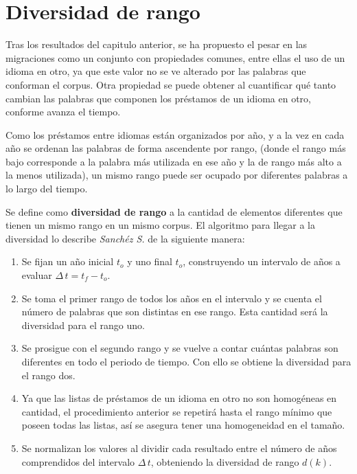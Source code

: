 \chapter{Diversidad de rango}
\label{cap.diversidad}

Tras los resultados del capitulo anterior, se ha propuesto el pesar en las migraciones como un conjunto con propiedades comunes, entre ellas el uso de un idioma en otro,  ya que este valor no se ve alterado por las palabras que conforman el corpus. Otra propiedad se puede obtener al cuantificar qué tanto cambian las palabras que componen los préstamos de un idioma en otro, conforme avanza el tiempo. 
  
Como los préstamos entre idiomas están organizados por año, y a la vez en cada año se ordenan las palabras de forma ascendente por rango, (donde el rango más bajo corresponde a la palabra más utilizada en ese año y la de rango más alto a la menos utilizada), un mismo rango puede ser ocupado por diferentes palabras a lo largo del tiempo. 

Se define como \textbf{diversidad de rango} a la cantidad de elementos  diferentes que tienen un mismo rango en un mismo corpus. El algoritmo para llegar a la diversidad lo describe \textit{Sanchéz S.} \cite{tesis.sergio} de la siguiente manera:


\begin{enumerate}
		
	\item Se fijan un año inicial $t_{o}$ y uno final $t_{o}$, construyendo un intervalo de años a evaluar $\Delta\,t = t_{f}- t_{o}$.
	
	\item Se toma el primer rango de todos los años en el intervalo y se cuenta el número de palabras que son distintas en ese rango. Esta cantidad será la diversidad para el rango uno.
	
	\item Se prosigue con el segundo rango y se vuelve a contar cuántas palabras son diferentes en todo el periodo de tiempo.  Con ello se obtiene la diversidad para el rango dos. 
	
	\item Ya que las listas de préstamos de un idioma en otro no son homogéneas en cantidad, el procedimiento anterior se repetirá hasta el rango mínimo que poseen todas las listas,  así se asegura tener una homogeneidad en el tamaño.
	
	\item Se normalizan los valores al dividir cada resultado entre el número de años comprendidos del intervalo $\Delta\,t$, obteniendo  la diversidad de rango $d(k)$.
	
\end{enumerate}

